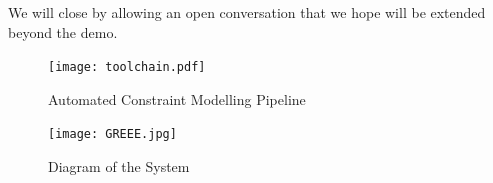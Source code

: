 We will close by allowing an open conversation that we hope will be extended beyond the demo.

\begin{figure}
  \centering
  \texttt{[image: toolchain.pdf]}
  \caption{Automated Constraint Modelling Pipeline}
  \label{fig:toolchain}
\end{figure}

\begin{figure}
  \centering
  \texttt{[image: GREEE.jpg]}
  \caption{Diagram of the System}
  \label{fig:GREEE}
\end{figure}
